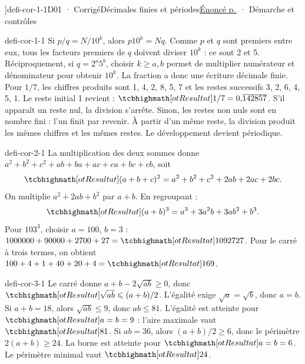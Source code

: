 \editionPage[\pdfbookmark[0]{Corrigés des défis}{bm-defi-cor-1-1-parent}]{defi-cor-1-1}{D01 · Corrigé}{Décimales finies et périodes}{\hyperref[defi-ex-1]{Énoncé p.\,\pageref*{defi-ex-1}} · Démarche et contrôles}
\begin{blocEdition}{defi-cor-1-1}
Si $p/q=N/10^k$, alors $p10^k=Nq$. Comme $p$ et $q$ sont premiers entre eux, tous les facteurs premiers de $q$ doivent diviser $10^k$ : ce sont 2 et 5. Réciproquement, si $q=2^a5^b$, choisir $k\ge a,b$ permet de multiplier numérateur et dénominateur pour obtenir $10^k$. La fraction a donc une écriture décimale finie.
Pour $1/7$, les chiffres produits sont 1, 4, 2, 8, 5, 7 et les restes successifs 3, 2, 6, 4, 5, 1. Le reste initial 1 revient : $\res{1/7=0{,}\overline{142857}}$.
S’il apparaît un reste nul, la division s’arrête. Sinon, les restes non nuls sont en nombre fini : l’un finit par revenir. À partir d’un même reste, la division produit les mêmes chiffres et les mêmes restes. Le développement devient périodique.
\end{blocEdition}
\begin{blocEdition}{defi-cor-2-1}
La multiplication des deux sommes donne $a^2+b^2+c^2+ab+ba+ac+ca+bc+cb$, soit
\[\res{(a+b+c)^2=a^2+b^2+c^2+2ab+2ac+2bc}.\]
On multiplie $a^2+2ab+b^2$ par $a+b$. En regroupant :
\[\res{(a+b)^3=a^3+3a^2b+3ab^2+b^3}.\]
Pour $103^3$, choisir $a=100$, $b=3$ : $1000000+90000+2700+27=\res{1092727}$. Pour le carré à trois termes, on obtient $100+4+1+40+20+4=\res{169}$.
\end{blocEdition}
\begin{blocEdition}{defi-cor-3-1}
Le carré donne $a+b-2\sqrt{ab}\ge0$, donc $\res{\sqrt{ab}\le(a+b)/2}$. L’égalité exige $\sqrt a=\sqrt b$, donc $a=b$.
Si $a+b=18$, alors $\sqrt{ab}\le9$, donc $ab\le81$. L’égalité est atteinte pour $\res{a=b=9}$ : l’aire maximale vaut $\res{81}$.
Si $ab=36$, alors $(a+b)/2\ge6$, donc le périmètre $2(a+b)\ge24$. La borne est atteinte pour $\res{a=b=6}$. Le périmètre minimal vaut $\res{24}$.
\label{fig-defi-cor-3}

\end{blocEdition}
